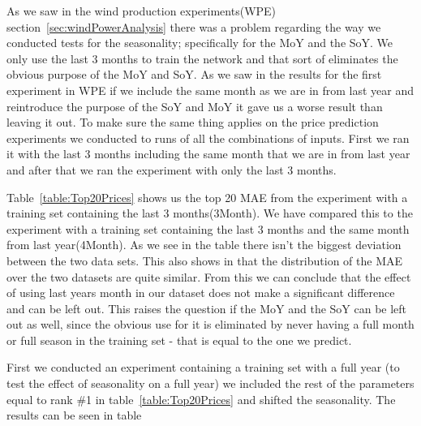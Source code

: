As we saw in the wind production experiments(WPE) section~\ref{sec:windPowerAnalysis} there was a problem regarding the way we conducted tests for the seasonality; specifically for the MoY and the SoY. We only use the last 3 months to train the network and that sort of eliminates the obvious purpose of the MoY and SoY. As we saw in the results for the first experiment in WPE if we include the same month as we are in from last year and reintroduce the purpose of the SoY and MoY it gave us a worse result than leaving it out. To make sure the same thing applies on the price prediction experiments we conducted to runs of all the combinations of inputs. First we ran it with the last 3 months including the same month that we are in from last year and after that we ran the experiment with only the last 3 months.

Table~\ref{table:Top20Prices} shows us the top 20 MAE from the experiment with a training set containing the last 3 months(3Month). We have compared this to the experiment with a training set containing the last 3 months and the same month from last year(4Month). As we see in the table there isn't the biggest deviation between the two data sets. This also shows in  that the distribution of the MAE over the two datasets are quite similar. From this we can conclude that the effect of using last years month in our dataset does not make a significant difference and can be left out. This raises the question if the MoY and the SoY can be left out as well, since the obvious use for it is eliminated by never having a full month or full season in the training set - that is equal to the one we predict.

First we conducted an experiment containing a training set with a full year (to test the effect of seasonality on a full year) we included the rest of the parameters equal to rank \#1 in table~\ref{table:Top20Prices} and shifted the seasonality. The results can be seen in table

